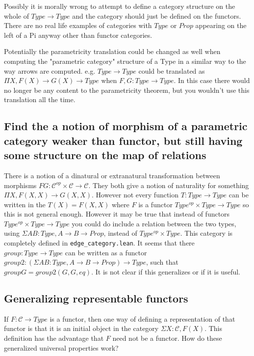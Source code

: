 \documentclass[12pt]{article} %
\theoremstyle{definition}
\theoremstyle{definition}
\theoremstyle{definition}
\theoremstyle{definition}
\begin{document}
Possibly it is morally wrong to attempt to define a category structure on the whole of
$Type \rightarrow Type$ and the category should just be defined on the functors. 
There are no real life examples of categories with $Type$ or $Prop$ appearing on the left of a 
Pi anyway other than functor categories.

Potentially the parametricity translation could be changed as well when computing the 
"parametric category" structure of a Type in a similar way to the way arrows are computed.
e.g. $Type \rightarrow Type$ could be translated as 
$\Pi X, F(X) \rightarrow G(X) \rightarrow Type$ when $F,G : Type \rightarrow Type$. 
In this case there would no longer be any content to the parametricity theorem, but
you wouldn't use this translation all the time.

\subsection{Find the a notion of morphism of a parametric category weaker than functor, but
  still having some structure on the map of relations}

There is a notion of a dinatural or extranatural transformation between morphisms 
$F G : \mathcal{C}^{op} \times \mathcal{C} \rightarrow \mathcal{C}$. They both give 
a notion of naturality for something $\Pi X, F(X, X) \rightarrow G(X,X)$. However not
every function $T : Type \rightarrow Type$ can be written in the $T(X) = F(X, X)$ where 
$F$ is a functor $Type^{op} \times Type \rightarrow Type$ so this is not general enough. 
However it may be true that instead of functors $Type^{op} \times Type \rightarrow Type$
you could do include a relation between the two types, using $\Sigma A B : Type, A \rightarrow B \rightarrow Prop$,
instead of $Type^{op} \times Type$. This category is completely defined in \lstinline{edge_category.lean}.
It seems that there $group : Type \rightarrow Type$ can be written as a functor
$group2 : (\Sigma A B : Type, A \rightarrow B \rightarrow Prop) \rightarrow Type$, such that 
$group G = group2(G, G, eq)$. It is not clear if this generalizes or if it is useful.

\subsection{Generalizing representable functors}
If $F : \mathcal{C} \rightarrow Type$ is a functor, then one way of defining a representation
of that functor is that it is an initial object in the category $\Sigma X : \mathcal{C}, F(X)$.
This definition has the advantage that $F$ need not be a functor. How do these generalized 
universal properties work?
\end{document}
